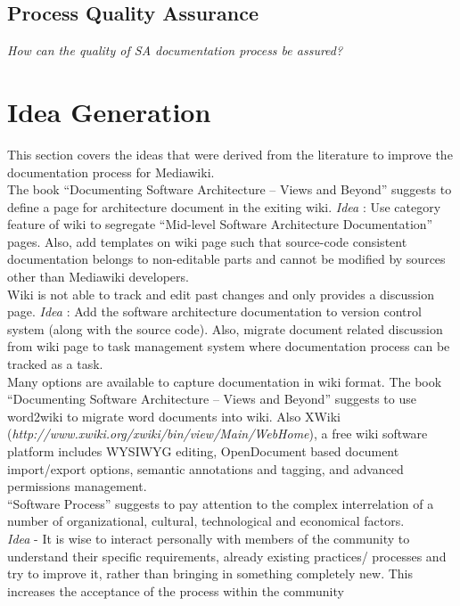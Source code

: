 \subsection{Process Quality Assurance}
\indent \emph {How can the quality of SA documentation process be assured?}
\newline

\section{Idea Generation}
\indent This section covers the ideas that were derived from the literature to improve the documentation process for Mediawiki.
\\\indent The book \enquote{Documenting Software Architecture – Views and Beyond} \cite{BachmannDocumentingSoftware2010} suggests to define a page for architecture document in the exiting wiki.
\emph{Idea} : Use category feature of wiki to segregate \enquote{Mid-level Software Architecture Documentation} pages. Also, add templates on wiki page such that source-code consistent documentation belongs to non-editable parts and cannot be modified by sources other than Mediawiki developers.
\newline
\\\indent Wiki is not able to track and edit past changes and only provides a discussion page.
\emph{Idea} : Add the software architecture documentation to version control system (along with the source code). Also, migrate document related discussion from wiki page to task management system where documentation process can be tracked as a task.
\\\indent Many options are available to capture documentation in wiki format. The book \enquote{Documenting Software Architecture – Views and Beyond} \cite{BachmannDocumentingSoftware2010} suggests to use word2wiki to migrate word documents into wiki. Also XWiki (\emph{http://www.xwiki.org/xwiki/bin/view/Main/WebHome}), a free wiki software platform includes WYSIWYG editing, OpenDocument based document import/export options, semantic annotations and tagging, and advanced permissions management.
\newline
\\\indent \enquote{Software Process} \cite{Fuggeffa1988} suggests to pay attention to the complex interrelation of a number of organizational, cultural, technological and economical factors.
\\\indent\emph{Idea}	- It is wise to interact personally with members of the community to understand their specific requirements, already existing practices/ processes and try to improve it, rather than bringing in something completely new. This increases the acceptance of the process within the community
